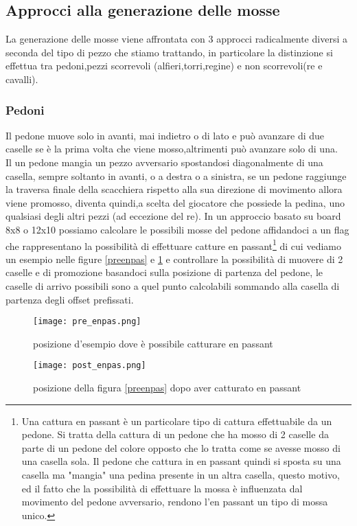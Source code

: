 \subsection{Approcci alla generazione delle mosse}
La generazione delle mosse viene affrontata con 3 approcci radicalmente diversi a seconda del tipo di pezzo che stiamo trattando, in particolare la distinzione si effettua tra 
pedoni,pezzi scorrevoli (alfieri,torri,regine) e non scorrevoli(re e cavalli).

\subsubsection{Pedoni}
Il pedone muove solo in avanti, mai indietro o di lato e può avanzare  di due caselle se è la prima volta che viene mosso,altrimenti può avanzare solo di una.
\\Il un pedone mangia un pezzo avversario spostandosi diagonalmente di una casella, sempre soltanto in avanti, o a destra o a sinistra, se un pedone raggiunge la traversa finale della scacchiera rispetto alla sua direzione di movimento
allora viene promosso, diventa quindi,a scelta del giocatore che possiede la pedina, uno qualsiasi degli altri pezzi (ad eccezione del re).
In un approccio basato su board 8x8 o 12x10 possiamo calcolare le possibili mosse del pedone affidandoci a un flag che rappresentano la possibilità di effettuare catture en passant\footnote{
Una cattura en passant è un particolare tipo di cattura effettuabile da un pedone. Si tratta della cattura di un pedone che ha mosso di 2 caselle da parte di un pedone del colore opposto che lo tratta come se avesse mosso di una casella sola. Il pedone che cattura in en passant quindi si sposta su una casella ma "mangia" una pedina presente in un altra casella, questo motivo, ed il fatto che la possibilità di effettuare la mossa è influenzata dal movimento del pedone avversario, rendono l'en passant un tipo di mossa unico.} di cui vediamo un esempio
nelle figure \ref{preenpas} e \ref{postenpas} e controllare la possibilità 
di muovere di 2 caselle e di promozione basandoci sulla posizione di partenza del pedone, le caselle di arrivo possibili sono a quel punto calcolabili sommando alla casella di partenza degli offset prefissati.


\begin{figure}
    \centering
    \begin{minipage}{0.45\textwidth}
        \centering
        \texttt{[image: pre\_enpas.png]} %
        \caption{posizione d'esempio dove è possibile catturare en passant}
        \label{preenpas}

    \end{minipage}\hfill
    \begin{minipage}{0.45\textwidth}
        \centering
        \texttt{[image: post\_enpas.png]} %
        \caption{posizione della figura \ref{preenpas} dopo aver catturato en passant }
        \label{postenpas}
    \end{minipage}
\end{figure}





